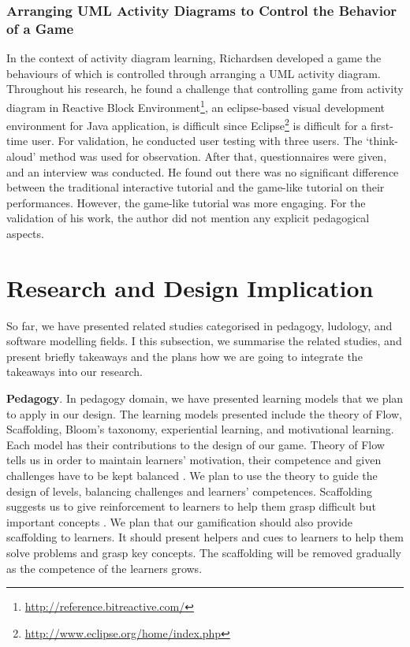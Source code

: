 \documentclass[12pt, a4paper]{report}
\begin{document}
{\subsubsection{Arranging UML Activity Diagrams to Control the Behavior of a Game}
In the context of activity diagram learning, Richardsen \cite{Richardsen2014} developed a game the behaviours of which is controlled through arranging a UML activity diagram. Throughout his research, he found a challenge that controlling game from activity diagram in Reactive Block Environment\footnote{\url{http://reference.bitreactive.com/}}, an eclipse-based visual development environment for Java application, is difficult since Eclipse\footnote{\url{http://www.eclipse.org/home/index.php}} is difficult for a first-time user. For validation, he conducted user testing with three users. The `think-aloud' method was used for observation. After that, questionnaires were given, and an interview was conducted. He found out there was no significant difference between the traditional interactive tutorial and the game-like tutorial on their performances. However, the game-like tutorial was more engaging. For the validation of his work, the author did not mention any explicit pedagogical aspects.\\

\section{Research and Design Implication}
\label{Research and Design Implication}
So far, we have presented related studies categorised in pedagogy, ludology, and software modelling fields. I this subsection, we summarise the related studies, and present briefly takeaways and the plans how we are going to integrate the takeaways into our research.     

\textbf{Pedagogy}. In pedagogy domain, we have presented learning models that we plan to apply in our design. The learning models presented include the theory of Flow, Scaffolding, Bloom's taxonomy, experiential learning, and motivational learning. Each model has their contributions to the design of our game. Theory of Flow tells us in order to maintain learners' motivation, their competence and given challenges have to be kept balanced \cite{csikszentmihalyi2014toward}. We plan to use the theory to guide the design of levels, balancing challenges and learners' competences. Scaffolding suggests us to give reinforcement to learners to help them grasp difficult but important concepts \cite{wood1976role, vygotsky1978mind}. We plan that our gamification should also provide scaffolding to learners. It should present helpers and cues to learners to help them solve problems and grasp key concepts. The scaffolding will be removed gradually as the competence of the learners grows. 

}
\end{document}
